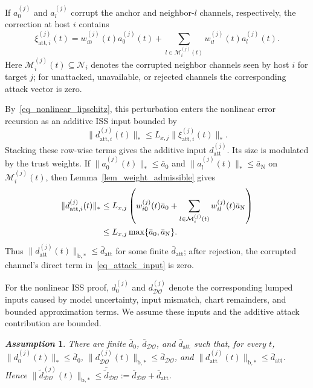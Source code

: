 \documentclass[letterpaper,journal]{IEEEtran}
\def\N{\mathcal{N}} %
\def\DO{\mathcal{DO}} %
\newtheorem{assumption}{\it Assumption}%
\begin{document}
If $a_0^{(j)}$ and $a_l^{(j)}$ corrupt the anchor and neighbor-$l$ channels, respectively, the correction at host $i$ contains
{\small
\begin{equation}
\xi_{\mathrm{att},i}^{(j)}(t)
=w_{i0}^{(j)}(t)a_{0}^{(j)}(t)
+\sum_{l\in\mathcal{M}_{i}^{(j)}(t)}w_{il}^{(j)}(t)a_{l}^{(j)}(t).
\label{eq_attack_input}
\end{equation}
}
Here $\mathcal{M}_i^{(j)}(t)\subseteq\N_i$ denotes the corrupted neighbor channels seen by host $i$ for target $j$; for unattacked, unavailable, or rejected channels the corresponding attack vector is zero.

By~\eqref{eq_nonlinear_lipschitz}, this perturbation enters the nonlinear error recursion as an additive ISS input bounded by
\begin{equation}
\|d_{\mathrm{att},i}^{(j)}(t)\|_*
\le L_{x,j}\|\xi_{\mathrm{att},i}^{(j)}(t)\|_* .
\label{eq_attack_lipschitz_bound}
\end{equation}
Stacking these row-wise terms gives the additive input $d_{\mathrm{att}}^{(j)}$. Its size is modulated by the trust weights.
If $\|a_{0}^{(j)}(t)\|_*\le \bar a_0$ and $\|a_{l}^{(j)}(t)\|_*\le \bar a_{\mathrm{N}}$ on $\mathcal{M}_{i}^{(j)}(t)$, then Lemma~\ref{lem_weight_admissible} gives
\begin{align}
\|d_{\mathrm{att},i}^{(j)}(t)\|_*
&\le L_{x,j}
\left(
w_{i0}^{(j)}(t)\bar a_0
+\sum_{l\in\mathcal{M}_{i}^{(j)}(t)}
w_{il}^{(j)}(t)\bar a_{\mathrm{N}}
\right) \notag\\
&\le L_{x,j}\max\{\bar a_0,\bar a_{\mathrm{N}}\}.
\label{eq_attack_bound}
\end{align}
Thus $\|d_{\mathrm{att}}^{(j)}(t)\|_{\mathrm{b},*}\le\bar d_{\mathrm{att}}$ for some finite $\bar d_{\mathrm{att}}$; after rejection, the corrupted channel's direct term in~\eqref{eq_attack_input} is zero.

For the nonlinear ISS proof, $d_0^{(j)}$ and $d_{\DO}^{(j)}$ denote the corresponding lumped inputs caused by model uncertainty, input mismatch, chart remainders, and bounded approximation terms. We assume these inputs and the additive attack contribution are bounded.
\begin{assumption}\label{assum_distur}
There are finite $\bar d_0$, $\bar d_{\DO}$, and $\bar d_{\mathrm{att}}$ such that, for every $t$, $\|d_0^{(j)}(t)\|_*\le\bar d_0$, $\|d_{\DO}^{(j)}(t)\|_{\mathrm{b},*}\le\bar d_{\DO}$, and $\|d_{\mathrm{att}}^{(j)}(t)\|_{\mathrm{b},*}\le\bar d_{\mathrm{att}}$. Hence $\|\tilde d_{\DO}^{(j)}(t)\|_{\mathrm{b},*}\le\bar{\tilde d}_{\DO}:=\bar d_{\DO}+\bar d_{\mathrm{att}}$.
\end{assumption}
\end{document}
